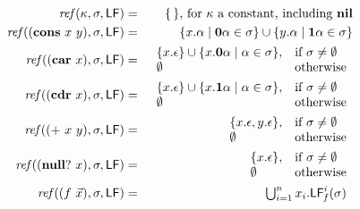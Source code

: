 \documentclass[9pt]{sigplanconf}
\def\myvec{\mathaccent"017E }
\begin{document}
\renewcommand{\pp}[2]{\ensuremath{#1\!\!:\!#2}} %
\begin{figure*}[t]
\renewcommand{\arraystretch}{1}
\begin{eqnarray*}
\mathit{ref\/}(\kappa,\sigma,\Lfonly)
          &=& \{\,\} \mbox{, for $\kappa$ a constant, including
$\NIL$}\\
\mathit{ref\/}((\CONS~x~y),\sigma,\Lfonly)
          &=& \{x.\alpha \mid \acar\alpha \in \sigma\} \cup \{y.\alpha
\mid \acdr\alpha \in \sigma\} \\
\mathit{ref\/}((\CAR~x),\sigma,\Lfonly)
          &=&    \begin{array}{l l}
                    \{x.\epsilon\} \cup \{x.\acar\alpha \mid \alpha \in
\sigma\}, & \mbox{if}~\sigma \ne \emptyset\\
                    \emptyset  & \mbox{otherwise}
                 \end{array} \\
\mathit{ref\/}((\CDR~x),\sigma,\Lfonly)
          &=&    \begin{array}{l l}
                    \{x.\epsilon\} \cup \{x.\acdr\alpha \mid \alpha \in
\sigma\}, & \mbox{if}~\sigma \ne \emptyset\\
                    \emptyset  & \mbox{otherwise}
                 \end{array} \\
\mathit{ref\/}((\PRIM~x~y),\sigma,\Lfonly)
          &=&    \begin{array}{l l}
                    \{x.\epsilon, y.\epsilon\},  & \mbox{if}~\sigma \ne
\emptyset\\
                    \emptyset  & \mbox{otherwise}
                 \end{array} \\
\mathit{ref\/}((\NULLQ~x),\sigma,\Lfonly)
          &=&    \begin{array}{l l}
                    \{x.\epsilon\},  & \mbox{if}~\sigma \ne \emptyset\\
                    \emptyset  & \mbox{otherwise}
                 \end{array} \\
\mathit{ref\/}((f~\myvec{x}),\sigma,\Lfonly)
          &=&  \begin{array}{@{}l}  %
               \bigcup_{i=1}^n x_i.\Lf{f}{i}{\sigma}

\end{array}
\end{eqnarray*}
\end{figure*}
\end{document}
